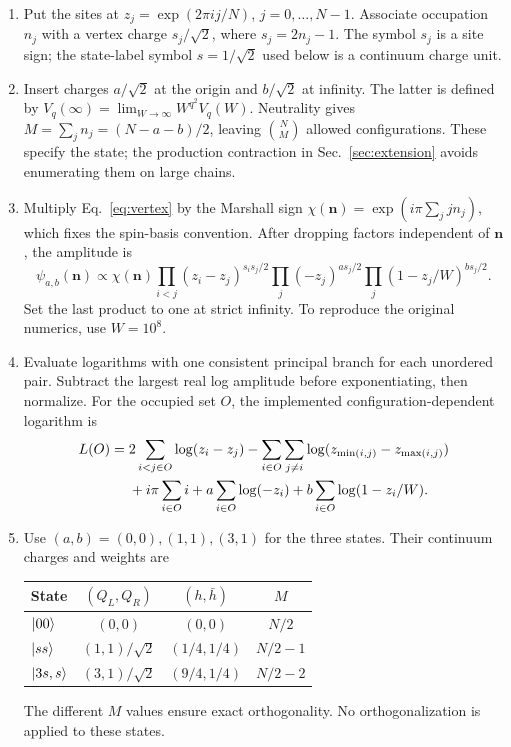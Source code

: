 \begin{enumerate}
\item Put the sites at $z_j=\exp(2\pi i j/N)$, $j=0,\ldots,N-1$.
Associate occupation $n_j$ with a vertex charge $s_j/\sqrt2$, where
$s_j=2n_j-1$. The symbol $s_j$ is a site sign; the state-label symbol
$s=1/\sqrt2$ used below is a continuum charge unit.
\item Insert charges $a/\sqrt2$ at the origin and $b/\sqrt2$ at infinity.
The latter is defined by
$V_q(\infty)=\lim_{W\to\infty}W^{q^2}V_q(W)$.
Neutrality gives $M=\sum_j n_j=(N-a-b)/2$, leaving
$\binom NM$ allowed configurations. These specify the state;
the production contraction in Sec.~\ref{sec:extension} avoids
enumerating them on large chains.
\item Multiply Eq.~\eqref{eq:vertex} by the Marshall sign
$\chi(\bm n)=\exp(i\pi\sum_j jn_j)$, which fixes the spin-basis convention.
After dropping factors independent of $\bm n$, the amplitude is
\begin{equation}
 \psi_{a,b}(\bm n)\propto
 \chi(\bm n)\prod_{i<j}(z_i-z_j)^{s_is_j/2}
 \prod_j(-z_j)^{a s_j/2}
 \prod_j(1-z_j/W)^{b s_j/2}.
 \label{eq:bosonblock}
\end{equation}
Set the last product to one at strict infinity. To reproduce the original
numerics, use $W=10^8$.
\item Evaluate logarithms with one consistent principal branch for each
unordered pair. Subtract the largest real log amplitude before
exponentiating, then normalize. For the occupied set $O$, the implemented
configuration-dependent logarithm is
\begin{align}
 L(O)={}&2\sum_{i<j\in O}\log(z_i-z_j)
 -\sum_{i\in O}\sum_{j\ne i}\log(z_{\min(i,j)}-z_{\max(i,j)})\notag\\
 &+i\pi\sum_{i\in O}i
 +a\sum_{i\in O}\log(-z_i)
 +b\sum_{i\in O}\log(1-z_i/W).
 \label{eq:logblock}
\end{align}
\item Use $(a,b)=(0,0),(1,1),(3,1)$ for the three states. Their
continuum charges and weights are
\begin{center}
\begin{tabular}{lccc}\toprule
State & $(Q_L,Q_R)$ & $(h,\bar h)$ & $M$\\\midrule
$\lvert 00\rangle$ & $(0,0)$ & $(0,0)$ & $N/2$\\
$\lvert ss\rangle$ & $(1,1)/\sqrt2$ & $(1/4,1/4)$ & $N/2-1$\\
$\lvert 3s,s\rangle$ & $(3,1)/\sqrt2$ & $(9/4,1/4)$ & $N/2-2$\\\bottomrule
\end{tabular}
\end{center}
The different $M$ values ensure exact orthogonality. No orthogonalization
is applied to these states.
\end{enumerate}

